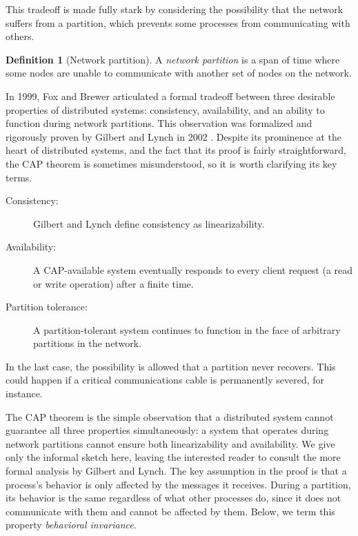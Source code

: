\documentclass[]             %
{NASA}                       %
\theoremstyle{definition}
\newtheorem{definition}[theorem]{Definition}
\begin{document}
This tradeoff is made fully stark by considering the possibility that
the network suffers from a partition, which prevents some processes
from communicating with others.

\begin{definition}[Network partition] A \emph{network partition} is a
span of time where some nodes are unable to communicate with another
set of nodes on the network.
\end{definition}

In 1999, Fox and Brewer \cite{1999foxbrewer} articulated a formal
tradeoff between three desirable properties of distributed systems:
consistency, availability, and an ability to function during network
partitions. This observation was formalized and rigorously proven by
Gilbert and Lynch in 2002 \cite{2002gilbertlynchCAP}. Despite its
prominence at the heart of distributed systems, and the fact that its
proof is fairly straightforward, the CAP theorem is sometimes
misunderstood, so it is worth clarifying its key terms.

\begin{description}
\item[Consistency:] Gilbert and Lynch define consistency as
  linearizability.
\item[Availability:] A CAP-available system eventually responds to every client
  request (a read or write operation) after a finite time.
\item[Partition tolerance:] A partition-tolerant system continues to
  function in the face of arbitrary partitions in the network.
\end{description}

In the last case, the possibility is allowed that a partition never
recovers. This could happen if a critical communications cable is
permanently severed, for instance.

The CAP theorem is the simple observation that a distributed system
cannot guarantee all three properties simultaneously: a system that
operates during network partitions cannot ensure both linearizability
and availability. We give only the informal sketch here, leaving the
interested reader to consult the more formal analysis by Gilbert and
Lynch. The key assumption in the proof is that a process's behavior is
only affected by the messages it receives. During a partition, its
behavior is the same regardless of what other processes do, since it
does not communicate with them and cannot be affected by them. Below,
we term this property \emph{behavioral invariance}.
\end{document}
